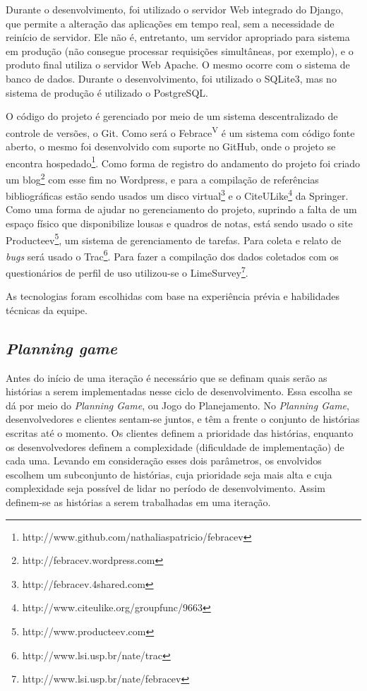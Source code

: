     Durante o desenvolvimento, foi utilizado o servidor Web integrado do Django, que permite a alteração das aplicações em tempo real, sem a necessidade de reinício de servidor. Ele não é, entretanto, um servidor apropriado para sistema em produção (não consegue processar requisições simultâneas, por exemplo), e o produto final utiliza o servidor Web Apache. O mesmo ocorre com o sistema de banco de dados. Durante o desenvolvimento, foi utilizado o SQLite3, mas no sistema de produção é utilizado o PostgreSQL.

    O código do projeto é gerenciado por meio de um sistema descentralizado de controle de versões, o Git. Como será o Febrace\textsuperscript{V} é um sistema com código fonte aberto, o mesmo foi desenvolvido com suporte no GitHub, onde o projeto se encontra hospedado\footnote{http://www.github.com/nathaliaspatricio/febracev}. Como forma de registro do andamento do projeto foi criado um blog\footnote{http://febracev.wordpress.com} com esse fim no Wordpress, e para a compilação de referências bibliográficas estão sendo usados um disco virtual\footnote{http://febracev.4shared.com} e o CiteULike\footnote{http://www.citeulike.org/groupfunc/9663} da Springer. Como uma forma de ajudar no gerenciamento do projeto, suprindo a falta de um espaço físico que disponibilize lousas e quadros de notas, está sendo usado o site Producteev\footnote{http://www.producteev.com}, um sistema de gerenciamento de tarefas. Para coleta e relato de \textit{bugs} será usado o Trac\footnote{http://www.lsi.usp.br/nate/trac}. Para fazer a compilação dos dados coletados com os questionários de perfil de uso utilizou-se o LimeSurvey\footnote{http://www.lsi.usp.br/nate/febracev}.

    As tecnologias foram escolhidas com base na experiência prévia e habilidades técnicas da equipe.

  \subsection{\textit{Planning game}}
    Antes do início de uma iteração é necessário que se definam quais serão as histórias a serem implementadas nesse ciclo de desenvolvimento. Essa escolha se dá por meio do \textit{Planning Game}, ou Jogo do Planejamento. No \textit{Planning Game}, desenvolvedores e clientes sentam-se juntos, e têm a frente o conjunto de histórias escritas até o momento. Os clientes definem a prioridade das histórias, enquanto os desenvolvedores definem a complexidade (dificuldade de implementação) de cada uma. Levando em consideração esses dois parâmetros, os envolvidos escolhem um subconjunto de histórias, cuja prioridade seja mais alta e cuja complexidade seja possível de lidar no período de desenvolvimento. Assim definem-se as histórias a serem trabalhadas em uma iteração.

